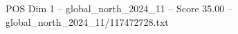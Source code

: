 \begin{textsample}{POS Dim 1 – global\_north\_2024\_11 – Score 35.00 – global\_north\_2024\_11/117472728.txt}
\end{textsample}
